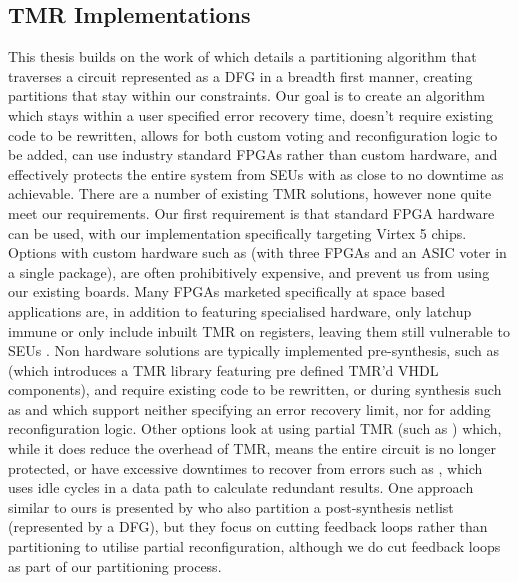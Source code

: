 \documentclass[12pt,final,oneside]{dwThesis} %
\begin{document}
\subsection{\acl{TMR} Implementations}
This thesis builds on the work of\cite{DiesselChange} which details a partitioning algorithm that traverses a circuit represented as a \ac{DFG} in a breadth first manner, creating partitions that stay within our constraints.
Our goal is to create an algorithm which stays within a user specified error recovery time, doesn't require existing code to be rewritten, allows for both custom voting and reconfiguration logic to be added, can use industry standard \acp{FPGA} rather than custom hardware, and effectively protects the entire system from \acp{SEU} with as close to no downtime as achievable. There are a number of existing \ac{TMR} solutions, however none quite meet our requirements.
Our first requirement is that standard \ac{FPGA} hardware can be used, with our implementation specifically targeting Virtex 5 chips. Options with custom hardware such as \cite{VFPGATMR} (with three \acp{FPGA} and an \ac{ASIC} voter in a single package), are often prohibitively expensive, and prevent us from using our existing boards.
Many \acp{FPGA} marketed specifically at space based applications are, in addition to featuring specialised hardware, only latchup immune or only include inbuilt \ac{TMR} on registers, leaving them still vulnerable to \acp{SEU} \cite{FPGAReview}.
Non hardware solutions are typically implemented pre-synthesis, such as \cite{ftmr} (which introduces a \ac{TMR} library featuring pre defined \ac{TMR}'d \ac{VHDL} components), and require existing code to be rewritten, or during synthesis such as \cite{synplify} and \cite{tmrtool} which support neither specifying an error recovery limit, nor for adding reconfiguration logic.
Other options look at using partial \ac{TMR} (such as \cite{partialTMR}) which, while it does reduce the overhead of \ac{TMR}, means the entire circuit is no longer protected, or have excessive downtimes to recover from errors such as \cite{VTMR}, which uses idle cycles in a data path to calculate redundant results.
One approach similar to ours is presented by \cite{PostSynth} who also partition a post-synthesis netlist (represented by a \ac{DFG}), but they focus on cutting feedback loops rather than partitioning to utilise partial reconfiguration, although we do cut feedback loops as part of our partitioning process.
\end{document}
